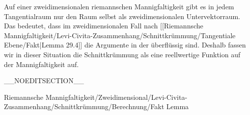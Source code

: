 {}
{

Auf einer zweidimensionalen riemannschen Mannigfaltigkeit gibt es in jedem Tangentialraum nur den Raum selbst als zweidimensionalen Untervektorraum. Das bedeutet, dass im zweidimensionalen Fall
nach
[[Riemannsche Mannigfaltigkeit/Levi-Civita-Zusammenhang/Schnittkrümmung/Tangentiale Ebene/Fakt|Lemma 29.4]]
die Argumente in der
überflüssig sind. Deshalb fassen wir in dieser Situation die Schnittkrümmung als eine reellwertige Funktion auf der Mannigfaltigkeit auf.

}

__NOEDITSECTION__

{Riemannsche Mannigfaltigkeit/Zweidimensional/Levi-Civita-Zusammenhang/Schnittkrümmung/Berechnung/Fakt}
{Lemma}
{}
{

\faktzusatz {}
\faktzusatz {}

}
